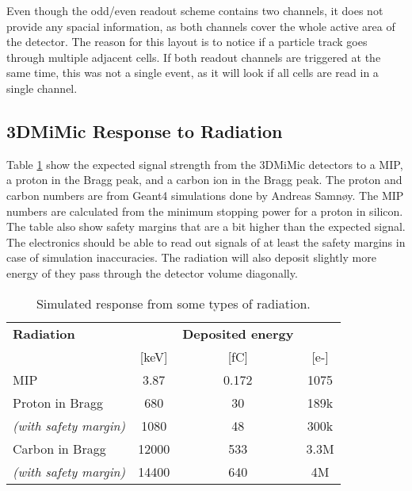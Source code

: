 \documentclass[../main/thesis.tex]{subfiles}
\begin{document}
Even though the odd/even readout scheme contains two channels, it does not provide any spacial information, as both channels cover the whole active area of the detector. The reason for this layout is to notice if a particle track goes through multiple adjacent cells. If both readout channels are triggered at the same time, this was not a single event, as it will look if all cells are read in a single channel.

\subsection{3DMiMic Response to Radiation}
Table \ref{tab-3d-response} show the expected signal strength from the 3DMiMic detectors to a \gls{MIP}, a proton in the Bragg peak, and a carbon ion in the Bragg peak. The proton and carbon numbers are from Geant4 simulations done by Andreas Samnøy. The \gls{MIP} numbers are calculated from the minimum stopping power for a proton in silicon. The table also show safety margins that are a bit higher than the expected signal. The electronics should be able to read out signals of at least the safety margins in case of simulation inaccuracies. The radiation will also deposit slightly more energy of they pass through the detector volume diagonally. 

\begin{table}[h!]
	\begin{center}
		\caption{Simulated response from some types of radiation. \citep{Samnoy}}
		\label{tab-3d-response}
		\begin{tabular}{lccc}\toprule
			\textbf{Radiation}           &           &\textbf{Deposited energy} &          \\
			& {[}keV{]} & {[}fC{]}         & {[}e-{]} \\ \midrule
			MIP                  & 3.87      & 0.172         & 1075     \\
			Proton in Bragg      & 680       & 30            & 189k     \\
			\textit{(with safety margin)} & 1080      & 48            & 300k     \\
			Carbon in Bragg      & 12000     & 533           & 3.3M     \\
			\textit{(with safety margin)} & 14400     & 640           & 4M	\\
			\bottomrule
		\end{tabular}
	\end{center}
\end{table}
\end{document}
